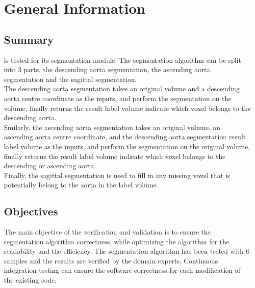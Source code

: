 \documentclass[12pt, titlepage]{article}
\begin{document}
\section{General Information}

\subsection{Summary}
\progname{} is tested for its segmentation module. The segmentation algorithm can be split into 3 parts, the descending aorta segmentation, the ascending aorta segmentation and the sagittal segmentation. \\

\noindent The descending aorta segmentation takes an original volume and a descending aorta centre coordinate as the inputs, and perform the segmentation on the volume, finally returns the result label volume indicate which voxel belongs to the descending aorta. \\

\noindent Smilarly, the ascending aorta segmentation takes an original volume, an ascending aorta centre coordinate, and the descending aorta segmentation result label volume as the inputs, and perform the segmentation on the original volume, finally returns the result label volume indicate which voxel belongs to the descending or ascending aorta. \\

\noindent Finally, the sagittal segmentation is used to fill in any missing voxel that is potentially belong to the aorta in the label volume.


\subsection{Objectives}

The main objective of the verification and validation is to ensure the segmentation algorithm correctness, while optimizing the algorithm for the readability and the efficiency.
The segmentation algorithm has been tested with 6 samples and the results are verified by the domain experts. Continuous integration testing can ensure the software correctness for each modification of the existing code.

\end{document}
